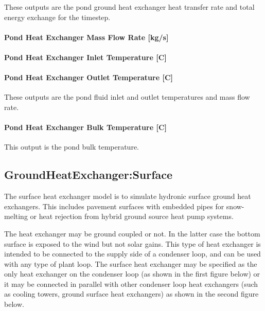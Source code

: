 These outputs are the pond ground heat exchanger heat transfer rate and total energy exchange for the timestep.

\paragraph{Pond Heat Exchanger Mass Flow Rate {[}kg/s{]}}\label{pond-heat-exchanger-mass-flow-rate-kgs}

\paragraph{Pond Heat Exchanger Inlet Temperature {[}C{]}}\label{pond-heat-exchanger-inlet-temperature-c}

\paragraph{Pond Heat Exchanger Outlet Temperature {[}C{]}}\label{pond-heat-exchanger-outlet-temperature-c}

These outputs are the pond fluid inlet and outlet temperatures and mass flow rate.

\paragraph{Pond Heat Exchanger Bulk Temperature {[}C{]}}\label{pond-heat-exchanger-bulk-temperature-c}

This output is the pond bulk temperature.

\subsection{GroundHeatExchanger:Surface}\label{groundheatexchangersurface}

The surface heat exchanger model is to simulate hydronic surface ground heat exchangers. This includes pavement surfaces with embedded pipes for snow-melting or heat rejection from hybrid ground source heat pump systems.

The heat exchanger may be ground coupled or not. In the latter case the bottom surface is exposed to the wind but not solar gains. This type of heat exchanger is intended to be connected to the supply side of a condenser loop, and can be used with any type of plant loop. The surface heat exchanger may be specified as the only heat exchanger on the condenser loop (as shown in the first figure below) or it may be connected in parallel with other condenser loop heat exchangers (such as cooling towers, ground surface heat exchangers) as shown in the second figure below.

